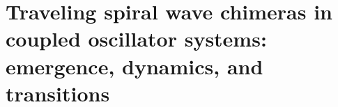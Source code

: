 \chapter{Traveling spiral wave chimeras in coupled
oscillator systems: emergence, dynamics, and
transitions}